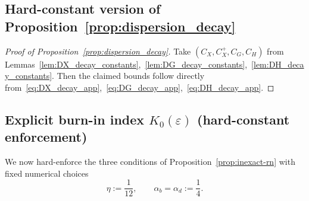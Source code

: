 \documentclass[11pt,a4paper]{article}
\begin{document}
\subsection{Hard-constant version of Proposition~\ref{prop:dispersion_decay}}
\begin{proof}[Proof of Proposition~\ref{prop:dispersion_decay}]
	Take $(C_X,C_X^{+},C_G,C_H)$ from Lemmas~\ref{lem:DX_decay_constants},~\ref{lem:DG_decay_constants},~\ref{lem:DH_decay_constants}.
	Then the claimed bounds follow directly from~\eqref{eq:DX_decay_app},~\eqref{eq:DG_decay_app},~\eqref{eq:DH_decay_app}.
\end{proof}

\subsection{Explicit burn-in index $K_0(\varepsilon)$ (hard-constant enforcement)}

We now hard-enforce the three conditions of Proposition~\ref{prop:inexact-rn} with fixed numerical choices
\[
\eta:=\frac{1}{12},
\qquad
\alpha_b=\alpha_d:=\frac14.
\]
\end{document}
